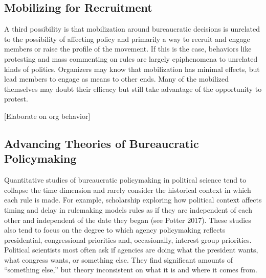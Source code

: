 \subsection{Mobilizing for Recruitment}

A third possibility is that mobilization around bureaucratic decisions is unrelated to the possibility of affecting policy and primarily a way to recruit and engage members or raise the profile of the movement. If this is the case, behaviors like protesting and mass commenting on rules are largely epiphenomena to unrelated kinds of politics. Organizers may know that mobilization has minimal effects, but lead members to engage as means to other ends. Many of the mobilized themselves may doubt their efficacy but still take advantage of the opportunity to protest. 




[Elaborate on org behavior]

\subsection{Advancing Theories of Bureaucratic Policymaking}

Quantitative studies of bureaucratic policymaking in political science tend to collapse the time dimension and rarely consider the historical context in which each rule is made. For example, scholarship exploring how political context affects timing and delay in rulemaking models rules as if they are independent of each other and independent of the date they began (see Potter 2017). These studies also tend to focus on the degree to which agency policymaking reflects presidential, congressional priorities and, occasionally, interest group priorities. Political scientists most often ask if agencies are doing what the president wants, what congress wants, or something else. They find significant amounts of ``something else,'' but theory inconsistent on what it is and where it comes from. 





